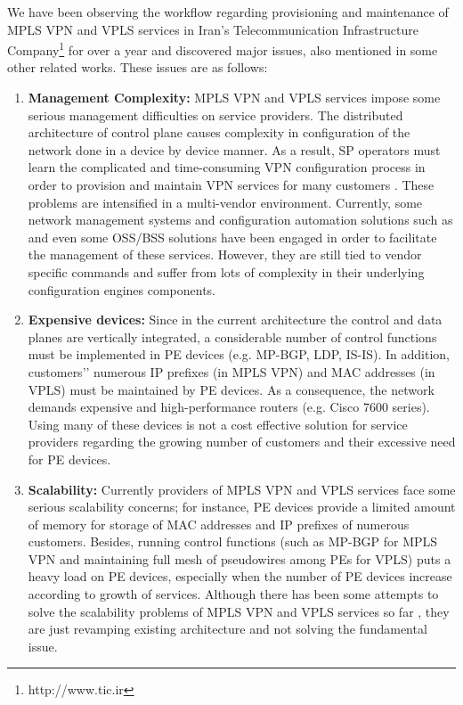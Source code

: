 \documentclass[10pt,conference]{IEEEtran}
\begin{document}
We have been observing the workflow regarding provisioning and maintenance of  MPLS VPN and VPLS services in Iran's Telecommunication Infrastructure Company\footnote{http://www.tic.ir} for over a year and discovered major issues, also mentioned in some other related works. These issues are as follows:
\begin{enumerate}

\item[(1)]
\textbf {Management Complexity:}
MPLS VPN and VPLS services impose some serious management difficulties on service providers.  The distributed architecture of control plane causes complexity in configuration of the network done in a device by device manner. As a result, SP operators must learn the complicated and time-consuming VPN configuration process in order to provision and maintain  VPN services for many customers \cite{28}\cite{7}\cite{12}. These problems are intensified in a multi-vendor environment. Currently, some network management systems and configuration automation solutions such as \cite{4}\cite{5}\cite{6}\cite{7} and even some OSS/BSS solutions have been engaged in order to facilitate the management of these services. However, they are still tied to vendor specific commands and suffer from lots of complexity in their underlying configuration engines components. 
\item[(2)]
\textbf {Expensive devices:}
Since in the current architecture the control and data planes are vertically integrated, a considerable number of control functions must be implemented in PE devices (e.g. MP-BGP, LDP, IS-IS). In addition, customers'’ numerous IP prefixes (in MPLS VPN) and MAC addresses (in VPLS) must be maintained by PE devices. As a consequence, the network demands expensive and high-performance routers (e.g. Cisco 7600 series). Using many of these devices is not a cost effective solution for service providers regarding the growing number of customers and their excessive need for PE devices. 
\item[(3)]
\textbf {Scalability:}
Currently providers of MPLS VPN and VPLS services face some serious scalability concerns; for instance, PE devices provide a limited amount of memory for storage of MAC addresses and IP prefixes of numerous customers. Besides, running control functions (such as MP-BGP for MPLS VPN and maintaining full mesh of pseudowires among PEs for VPLS) puts a heavy load on PE devices, especially  when the number of PE devices increase according to growth of services. Although there has been some attempts to solve the scalability problems of MPLS VPN and VPLS services so far \cite{9}\cite{3}\cite{8}, they are just revamping existing architecture and not solving the  fundamental issue. 
\end{enumerate}
\end{document}
